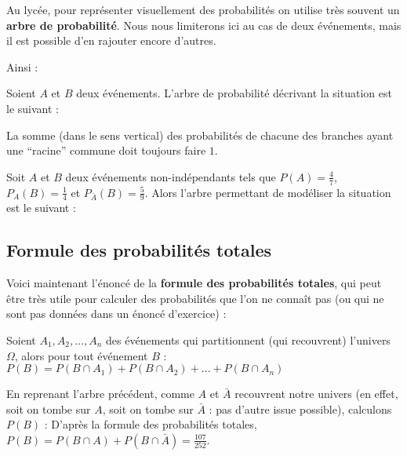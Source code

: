 	Au lycée, pour représenter visuellement des probabilités on utilise très souvent un \textbf{arbre de probabilité}. Nous nous limiterons ici au cas de deux événements, mais il est possible d'en rajouter encore d'autres.

	Ainsi :

	\begin{formula}[Définition]
		Soient $A$ et $B$ deux événements. L'arbre de probabilité décrivant la situation est le suivant :
	\end{formula}

	La somme (dans le sens vertical) des probabilités de chacune des branches ayant une ``racine'' commune doit toujours faire $1$.

	\begin{tip}[Exemple]
		Soit $A$ et $B$ deux événements non-indépendants tels que $P(A) = \frac{4}{7}$, $P_{A}(B) = \frac{1}{4}$ et $P_{\bar{A}}(B) = \frac{5}{9}$.
		\newline
		Alors l'arbre permettant de modéliser la situation est le suivant :
	\end{tip}

	\subsection{Formule des probabilités totales}

	Voici maintenant l'énoncé de la \textbf{formule des probabilités totales}, qui peut être très utile pour calculer des probabilités que l'on ne connaît pas (ou qui ne sont pas données dans un énoncé d'exercice) :

	\begin{formula}
		Soient $A_1, A_2, ..., A_n$ des événements qui partitionnent (qui recouvrent) l'univers $\Omega$, alors pour tout événement $B$ :
		\newpar
		$P(B) = P(B \cap A_1) + P(B \cap A_2) + \dots + P(B \cap A_n)$
	\end{formula}

	\begin{tip}[Exemple]
		En reprenant l'arbre précédent, comme $A$ et $\bar{A}$ recouvrent notre univers (en effet, soit on tombe sur $A$, soit on tombe sur $\bar{A}$ : pas d'autre issue possible), calculons $P(B)$ :
		\newpar
		D'après la formule des probabilités totales, $P(B) = P(B \cap A) + P(B \cap \bar{A}) = \frac{107}{252}$.
	\end{tip}

